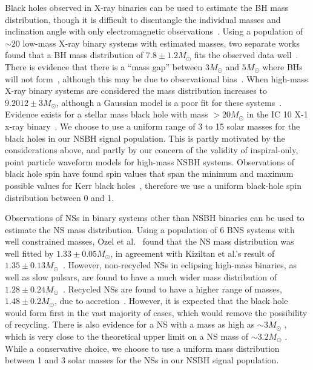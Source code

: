 Black holes observed in X-ray binaries can be used to estimate the \ac{BH}
mass distribution, though it is difficult to disentangle the individual masses
and inclination angle with only electromagnetic observations~\cite{Ozel:2010su}.
Using a population of $\sim20$ low-mass X-ray binary systems with estimated 
masses, two separate works found that a \ac{BH} mass distribution of $7.8 \pm 
1.2 M_{\odot}$ fits the observed data well~\cite{Ozel:2010su,Farr:2010tu}. 
There is evidence that there is a ``mass gap'' between $3M_{\odot}$ and 
$5M_{\odot}$ where \acp{BH} will not form~\cite{Ozel:2010su,Farr:2010tu}, 
although this may be due to observational bias~\cite{Kreidberg:2012ud}. When 
high-mass X-ray binary systems are considered the mass distribution increases 
to $9.2012 \pm 3 M_{\odot}$, although a Gaussian model is a poor fit for these 
systems~\cite{Farr:2010tu}. Evidence exists for a stellar mass black hole with 
mass $> 20 M_{\odot}$ in the IC 10 X-1 x-ray 
binary~\cite{Prestwich:2007mj,Silverman:2008ss}. We choose to use a uniform 
range of 3 to 15 solar masses for the black holes in our \ac{NSBH} signal 
population. This is partly motivated by the considerations above, and partly by 
our concern of the validity of inspiral-only, point particle waveform models 
for high-mass \ac{NSBH} systems.
Observations of black hole spin have found spin values that span the minimum and
maximum possible values for Kerr black holes~\cite{Miller:2009cw}, therefore we 
use a uniform black-hole spin distribution between 0 and 1.

Observations of \acp{NS} in binary systems other than \ac{NSBH} binaries can be
used to estimate the \ac{NS} mass distribution. Using a
population of 6 \ac{BNS} systems with well constrained masses,
Ozel et al.~\cite{Ozel:2012ax}
found that the \ac{NS} mass distribution was well fitted by $1.33 \pm 0.05
M_{\odot}$, in agreement with Kiziltan et al.'s result
of $1.35 \pm 0.13 M_{\odot}$~\cite{Kiziltan:2010ct}. However, non-recycled
\acp{NS} in eclipsing high-mass binaries, as well as slow
pulsars, are found to have a much wider mass distribution of $1.28 \pm
0.24 M_{\odot}$~\cite{Ozel:2012ax}. Recycled \acp{NS} are found to have a
higher range of masses, $1.48 \pm 0.2 M_{\odot}$, due to
accretion~\cite{Ozel:2012ax}. However, it is expected that the black hole would
form first in the vast majority of cases, which would remove the
possibility of recycling.
There is also evidence for a \ac{NS}
with a mass as high as $\sim 3 M_{\odot}$ \cite{Freire:2007jd}, which is very
close to the theoretical upper limit on a \ac{NS}
mass of $\sim3.2 M_{\odot}$ \cite{Rhoades:1974fn}. While a conservative choice, 
we choose to use a uniform mass distribution between 1 and 3 solar masses for 
the \acp{NS} in our \ac{NSBH} signal population.

